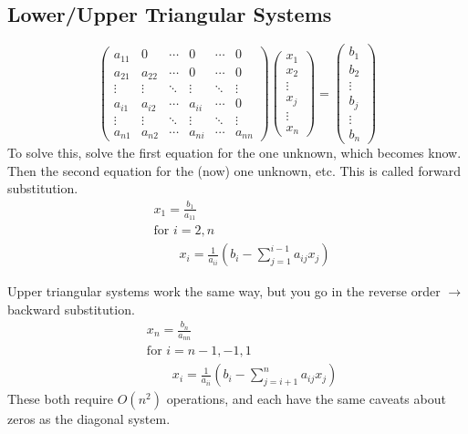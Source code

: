 \documentclass[12pt, answers]{exam}
\begin{document}
\subsection*{Lower/Upper Triangular Systems}
\begin{equation}
   \begin{pmatrix}
      a_{11} & 0      & \cdots & 0      & \cdots & 0 \\
      a_{21} & a_{22} & \cdots & 0      & \cdots & 0 \\
      \vdots & \vdots & \ddots & \vdots & \ddots & \vdots \\     
      a_{i1} & a_{i2} & \cdots & a_{ii} & \cdots & 0 \\
      \vdots & \vdots & \ddots & \vdots & \ddots & \vdots \\
      a_{n1} & a_{n2} & \cdots & a_{ni} & \cdots & a_{nn} 
    \end{pmatrix} 
    \begin{pmatrix} x_1 \\ x_2 \\ \vdots \\ x_j \\ \vdots \\ x_n \end{pmatrix} =
    \begin{pmatrix} b_1 \\ b_2 \\ \vdots \\ b_j \\ \vdots \\ b_n \end{pmatrix}
    \nonumber   
\end{equation} 
%
To solve this, solve the first equation for the one unknown, which becomes know. Then the second equation for the (now) one unknown, etc. This is called forward substitution.
%
\ifprintanswers
\begin{align}
&x_1 = \frac{b_1}{a_{11}} \nonumber \\
&\text{for } i = 2, n \nonumber \\
&\qquad x_i = \frac{1}{a_{ii}}(b_i - \sum_{j=1}^{i-1} a_{ij} x_j) \nonumber
\end{align}
\else
\vspace*{6em}
\fi

Upper triangular systems work the same way, but you go in the reverse order $\rightarrow$ backward substitution. 
%
\begin{align}
&x_n = \frac{b_n}{a_{nn}} \nonumber \\
&\text{for } i = n-1, -1, 1 \nonumber \\
&\qquad x_i = \frac{1}{a_{ii}}(b_i - \sum_{j=i+1}^{n} a_{ij} x_j) \nonumber
\end{align}
%
\ifprintanswers
These both require $O(n^2)$ operations, and each have the same caveats about zeros as the diagonal system.
\else
\\\vspace*{1em}
\fi
\end{document}
